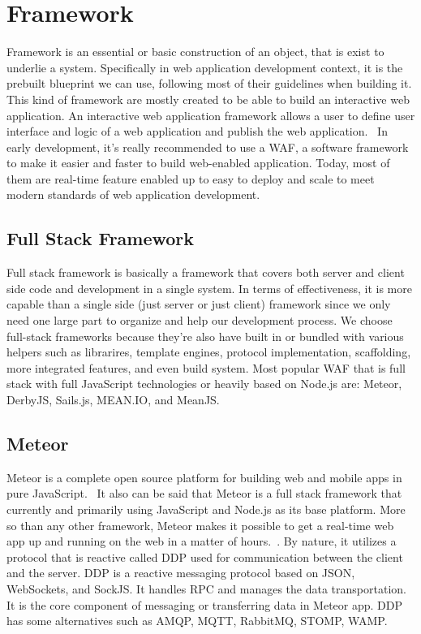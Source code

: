\section{Framework}
\label{sec:framework}

Framework is an essential or basic construction of an object, that is exist to underlie a system.
Specifically in web application development context, it is the prebuilt blueprint we can use, following most of their guidelines when building it.
This kind of framework are mostly created to be able to build an interactive web application.
An interactive web application framework allows a user to define user interface and logic of a web application and publish the web application.~\autocite{Addala:2013:InteractiveWebAppFramework}
In early development, it's really recommended to use a \ac{WAF}, a software framework to make it easier and faster to build web-enabled application.
Today, most of them are real-time feature enabled up to easy to deploy and scale to meet modern standards of web application development.

\subsection{Full Stack Framework}
\label{ssec:fullstack-framework}

Full stack framework is basically a framework that covers both server and client side code and development in a single system.
In terms of effectiveness, it is more capable than a single side (just server or just client) framework since we only need one large part to organize and help our development process.
We choose full-stack frameworks because they're also have built in or bundled with various helpers such as librarires, template engines, protocol implementation, scaffolding, more integrated features, and even build system.
Most popular \ac{WAF} that is full stack with full JavaScript technologies or heavily based on Node.js are: Meteor, DerbyJS, Sails.js, MEAN.IO, and MeanJS.

\subsection{Meteor}
\label{ssec:meteor}

Meteor is a complete open source platform for building web and mobile apps in pure JavaScript.~\autocite{Meteor2015}
It also can be said that Meteor is a full stack framework that currently and primarily using JavaScript and Node.js as its base platform.
More so than any other framework, Meteor makes it possible to get a real-time web app up and running on the web in a matter of hours.~\autocite{Coleman2014Meteor}.
By nature, it utilizes a protocol that is reactive called \ac{DDP} used for communication between the client and the server.
\ac{DDP} is a reactive messaging protocol based on \ac{JSON}, WebSockets, and SockJS.
It handles \ac{RPC} and manages the data transportation.
It is the core component of messaging or transferring data in Meteor app.
\ac{DDP} has some alternatives such as \ac{AMQP}, \ac{MQTT}, RabbitMQ, \ac{STOMP}, \ac{WAMP}.

